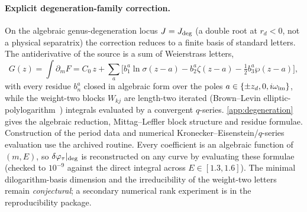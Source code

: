 \documentclass[12pt]{iopart}
\theoremstyle{plain}
\theoremstyle{definition}
\theoremstyle{plain}
\theoremstyle{remark}
\begin{document}
\paragraph{Explicit degeneration-family correction.} On the algebraic genus-degeneration
locus $J=J_{\rm deg}$ (a double root at $r_d<0$, not a physical separatrix) the correction
reduces to a finite basis of standard letters. The antiderivative of the source is a sum
of Weierstrass letters,
\begin{equation}
    G(z)=\int\partial_m F=C_0\,z+\sum_a\Big[b_1^a\ln\sigma(z-a)-b_2^a\zeta(z-a)
        -\tfrac12 b_3^a\wp(z-a)\Big],
    \label{eq:vaidya-sep-G}
\end{equation}
with every residue $b_n^a$ closed in algebraic form over the poles
$a\in\{\pm z_d,0,i\omega_{\rm im}\}$, while the weight-two blocks $W_{kj}$ are length-two
iterated (Brown--Levin elliptic-polylogarithm~\cite{BrownLevin2011}) integrals evaluated by
a convergent $q$-series. \ref{app:degeneration} gives the algebraic reduction,
Mittag--Leffler block structure and residue formulae. Construction of the period data and
numerical Kronecker--Eisenstein/$q$-series evaluation use the archived routine. Every
coefficient is an algebraic function of $(m,E)$, so
$\delta\varphi_\tau|_{\rm deg}$ is reconstructed on any curve by evaluating these formulae
(checked to $10^{-9}$ against the direct integral across $E\in[1.3,1.6]$). The minimal
dilogarithm-basis dimension and the irreducibility of the weight-two letters remain
\emph{conjectural}; a secondary numerical rank experiment is in the reproducibility
package.
\end{document}
